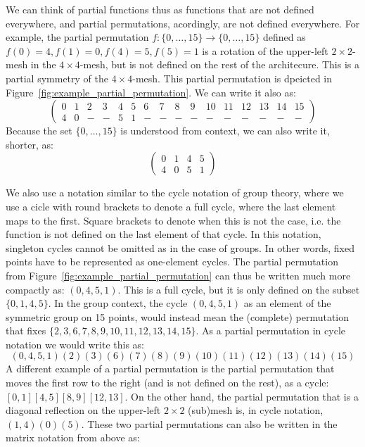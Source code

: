 We can think of partial functions thus as functions that are not defined everywhere, and partial permutations, acordingly, are not defined everywhere.
For example, the partial permutation $f : \{0,\ldots,15\} \rightarrow \{0,\ldots,15\}$ defined as $f(0) = 4, f(1) = 0, f(4) = 5, f(5) = 1$ is a rotation of the upper-left $2 \times 2$-mesh in the $4\times 4$-mesh, but is not defined on the rest of the architecure. This is a partial symmetry of the $4\times 4$-mesh. This partial permutation is dpeicted in Figure~\ref{fig:example_partial_permutation}. We can write it also as:
\begin{equation*}
\left(
\begin{array}{llllllllllllllll}
0 & 1 & 2 & 3 & 4 & 5 & 6 & 7 & 8 & 9 & 10 & 11 & 12 & 13 & 14 & 15\\
4 & 0 & - & - & 5 & 1 & - & - & - & - &  - &  - &  - &  - &  - &  -
\end{array}
\right)
\end{equation*}
Because the set $\{0,\ldots,15\}$ is understood from context, we can also write it, shorter, as:
\begin{equation*}
\left(
\begin{array}{llll}
0 & 1 & 4 & 5 \\
4 & 0 &  5 & 1
\end{array}
\right)
\end{equation*}

We also use a notation similar to the cycle notation of group theory, where we use a cicle with round brackets to denote a full cycle, where the last element maps to the first.
Square brackets to denote when this is not the case, i.e. the function is not defined on the last element of that cycle. In this notation, singleton cycles cannot be omitted as in the case of groups.
In other words, fixed points have to be represented as one-element cycles.
The partial permutation from Figure~\ref{fig:example_partial_permutation} can thus be written much more compactly as: $(0,4,5,1)$.
This is a full cycle, but it is only defined on the subset $\{0,1,4,5\}$.
In the group context, the cycle $(0,4,5,1)$ as an element of the symmetric group on 15 points, would instead mean the (complete) permutation that fixes $\{2,3,6,7,8,9,10,11,12,13,14,15\}$.
As a partial permutation in cycle notation we would write this as: \[(0,4,5,1)(2)(3)(6)(7)(8)(9)(10)(11)(12)(13)(14)(15) \]
A different example of a partial permutation is the partial permutation that moves the first row to the right (and is not defined on the rest), as a cycle: $[0,1][4,5][8,9][12,13]$.
On the other hand, the partial permutation that is a diagonal reflection on the upper-left $2 \times 2$ (sub)mesh is, in cycle notation, $(1,4)(0)(5)$.
These two partial permutations can also be written in the matrix notation from above as:

